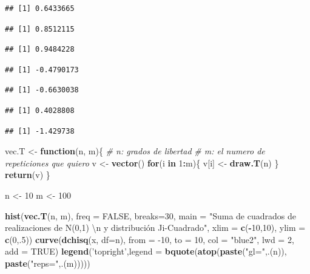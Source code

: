 \documentclass[]{article}
\newenvironment{Shaded}{\begin{snugshade}}{\end{snugshade}}
\newcommand{\CharTok}[1]{\textcolor[rgb]{0.31,0.60,0.02}{#1}}
\newcommand{\CommentTok}[1]{\textcolor[rgb]{0.56,0.35,0.01}{\textit{#1}}}
\newcommand{\ControlFlowTok}[1]{\textcolor[rgb]{0.13,0.29,0.53}{\textbf{#1}}}
\newcommand{\DataTypeTok}[1]{\textcolor[rgb]{0.13,0.29,0.53}{#1}}
\newcommand{\DecValTok}[1]{\textcolor[rgb]{0.00,0.00,0.81}{#1}}
\newcommand{\KeywordTok}[1]{\textcolor[rgb]{0.13,0.29,0.53}{\textbf{#1}}}
\newcommand{\NormalTok}[1]{#1}
\newcommand{\OperatorTok}[1]{\textcolor[rgb]{0.81,0.36,0.00}{\textbf{#1}}}
\newcommand{\OtherTok}[1]{\textcolor[rgb]{0.56,0.35,0.01}{#1}}
\newcommand{\StringTok}[1]{\textcolor[rgb]{0.31,0.60,0.02}{#1}}
\begin{document}
\begin{verbatim}
## [1] 0.6433665
\end{verbatim}

\begin{verbatim}
## [1] 0.8512115
\end{verbatim}

\begin{verbatim}
## [1] 0.9484228
\end{verbatim}

\begin{verbatim}
## [1] -0.4790173
\end{verbatim}

\begin{verbatim}
## [1] -0.6630038
\end{verbatim}

\begin{verbatim}
## [1] 0.4028808
\end{verbatim}

\begin{verbatim}
## [1] -1.429738
\end{verbatim}

\begin{Shaded}
\begin{Highlighting}[]
\NormalTok{vec.T <-}\StringTok{ }\ControlFlowTok{function}\NormalTok{(n, m)\{}
  \CommentTok{# n: grados de libertad}
  \CommentTok{# m: el numero de repeticiones que quiero}
\NormalTok{  v <-}\StringTok{ }\KeywordTok{vector}\NormalTok{()}
  \ControlFlowTok{for}\NormalTok{(i }\ControlFlowTok{in} \DecValTok{1}\OperatorTok{:}\NormalTok{m)\{}
\NormalTok{    v[i] <-}\StringTok{ }\KeywordTok{draw.T}\NormalTok{(n)}
\NormalTok{  \}}
  \KeywordTok{return}\NormalTok{(v)}
\NormalTok{\}}

\NormalTok{n <-}\StringTok{ }\DecValTok{10} 
\NormalTok{m <-}\StringTok{ }\DecValTok{100}



\KeywordTok{hist}\NormalTok{(}\KeywordTok{vec.T}\NormalTok{(n, m), }\DataTypeTok{freq =} \OtherTok{FALSE}\NormalTok{, }\DataTypeTok{breaks=}\DecValTok{30}\NormalTok{,}
     \DataTypeTok{main =} \StringTok{"Suma de cuadrados de realizaciones de N(0,1) }\CharTok{\textbackslash{}n}\StringTok{ y distribución Ji-Cuadrado"}\NormalTok{,}
     \DataTypeTok{xlim =} \KeywordTok{c}\NormalTok{(}\OperatorTok{-}\DecValTok{10}\NormalTok{,}\DecValTok{10}\NormalTok{), }\DataTypeTok{ylim =} \KeywordTok{c}\NormalTok{(}\DecValTok{0}\NormalTok{,.}\DecValTok{5}\NormalTok{))}
\KeywordTok{curve}\NormalTok{(}\KeywordTok{dchisq}\NormalTok{(x, }\DataTypeTok{df=}\NormalTok{n),}
      \DataTypeTok{from =} \DecValTok{-10}\NormalTok{, }\DataTypeTok{to =} \DecValTok{10}\NormalTok{,}
      \DataTypeTok{col  =} \StringTok{"blue2"}\NormalTok{,}
      \DataTypeTok{lwd  =} \DecValTok{2}\NormalTok{,}
      \DataTypeTok{add  =} \OtherTok{TRUE}\NormalTok{)}
\KeywordTok{legend}\NormalTok{(}\StringTok{'topright'}\NormalTok{,}\DataTypeTok{legend =}  \KeywordTok{bquote}\NormalTok{(}\KeywordTok{atop}\NormalTok{(}\KeywordTok{paste}\NormalTok{(}\StringTok{"gl="}\NormalTok{,.(n)), }\KeywordTok{paste}\NormalTok{(}\StringTok{"reps="}\NormalTok{,.(m)))))}
\end{Highlighting}
\end{Shaded}
\end{document}
